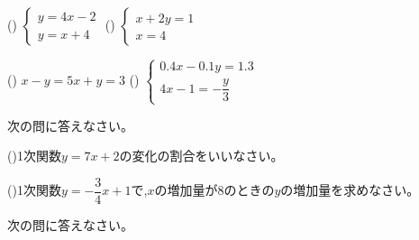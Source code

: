 \documentclass[
  12pt,a4paper,lualatex,ja=standard]{bxjsarticle}
\begin{document}
\begin{flushleft}
\vfill

()\hspace{2.5pt}
$
\left\{
\begin{array}{l}
  y = 4x -2 \\
  y = x + 4
\end{array}
\right.
$
\hspace{50mm}
()\hspace{2.5pt}
$
\left\{
\begin{array}{l}
  x + 2y =1 \\
  x = 4
\end{array}
\right.
$

\vfill

()\hspace{2.5pt}
$
x - y = 5x + y = 3
$
\hspace{50mm}
()\hspace{2.5pt}
$
\left\{
\begin{array}{l}
  0.4x - 0.1y = 1.3 \\
  4x - 1 = -\dfrac{y}{3}
\end{array}
\right.
$

\vfill

\newpage

\noindent{} \hspace{1pt}次の問に答えなさい。
\setcounter{skaunta}{0}

()\hspace{2.5pt}1次関数$y = 7x + 2$の変化の割合をいいなさい。

\vfill

()\hspace{2.5pt}1次関数$y = -\dfrac{3}{4}x + 1$で,$x$の増加量が$8$のときの$y$の増加量を求めなさい。

\vfill


\vfill

\setcounter{skaunta}{0}

\noindent{} \hspace{1pt}次の問に答えなさい。


\end{flushleft}
\end{document}
